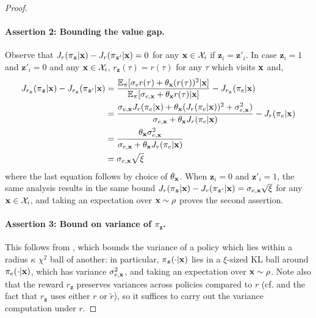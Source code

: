 \begin{proof}
\paragraph{Assertion 2: Bounding the value gap.} Observe that $J_r (\pi_{\bm{z}} | \mathbf{x}) - J_r(\pi_{\bm{z}'} | \mathbf{x}) = 0$ for any $\mathbf{x} \in \mathcal{X}_i$ if $\bm{z}_i = \bm{z}'_i$. In case $\bm{z}_i = 1$ and $\bm{z}'_i = 0$ and any $\mathbf{x} \in \mathcal{X}_i$, $r_{\bm{z}} (\tau) = r (\tau)$ for any $\tau$ which visits $\mathbf{x}$ and,
\begin{align}
    J_{r_{\bm{z}}} (\pi_{\bm{z}} | \mathbf{x}) - J_{r_{\bm{z}}} (\pi_{\bm{z}'} | \mathbf{x})
    &= \frac{\mathbb{E}_\pi [\sigma_{e} r (\tau) + \theta_{\mathbf{x}} (r (\tau))^2 | \mathbf{x} ]}{\mathbb{E}_\pi [\sigma_{e,\mathbf{x}} + \theta_{\mathbf{x}} r(\tau) | \mathbf{x} ]} - J_{r_{\bm{z}}} (\pi_e | \mathbf{x}) \nonumber\\
    &= \frac{\sigma_{e,\mathbf{x}} J_r (\pi_e | \mathbf{x}) + \theta_{\mathbf{x}} (J_r(\pi_e | \mathbf{x}))^2 + \sigma_{e,\mathbf{x}}^2)}{\sigma_{e,\mathbf{x}} + \theta_{\mathbf{x}} J_r(\pi_e | \mathbf{x})} - J_r(\pi_e | \mathbf{x}) \nonumber\\
    &= \frac{\theta_{\mathbf{x}} \sigma_{e,\mathbf{x}}^2}{\sigma_{e,\mathbf{x}} + \theta_{\mathbf{x}} J_r(\pi_e | \mathbf{x})} \nonumber\\
    &= \sigma_{e,\mathbf{x}} \sqrt{\xi} \label{eq:883}
\end{align}
where the last equation follows by choice of $\theta_{\mathbf{x}}$. When $\bm{z}_i = 0$ and $\bm{z}'_i = 1$, the same analysis results in the same bound $J_r (\pi_{\bm{z}} | \mathbf{x}) - J_r(\pi_{\bm{z}'} | \mathbf{x}) = \sigma_{e,\mathbf{x}} \sqrt{\xi}$ for any $\mathbf{x} \in \mathcal{X}_i$, and taking an expectation over $\mathbf{x} \sim \rho$ proves the second assertion.

\paragraph{Assertion 3: Bound on variance of $\pi_{\bm{z}}$.} This follows from , which bounds the variance of a policy which lies within a radius $\kappa$ $\chi^2$ ball of another: in particular, $\pi_{\bm{z}} (\cdot|\mathbf{x})$ lies in a $\xi$-sized KL ball around $\pi_e (\cdot|\mathbf{x})$, which has variance $\sigma_{e,\mathbf{x}}^2$, and taking an expectation over $\mathbf{x} \sim \rho$. Note also that the reward $r_{\bm{z}}$ preserves variances across policies compared to $r$ (cf.  and the fact that $r_{\bm{z}}$ uses either $r$ or $\widetilde{r}$), so it suffices to carry out the variance computation under $r$.


\end{proof}
